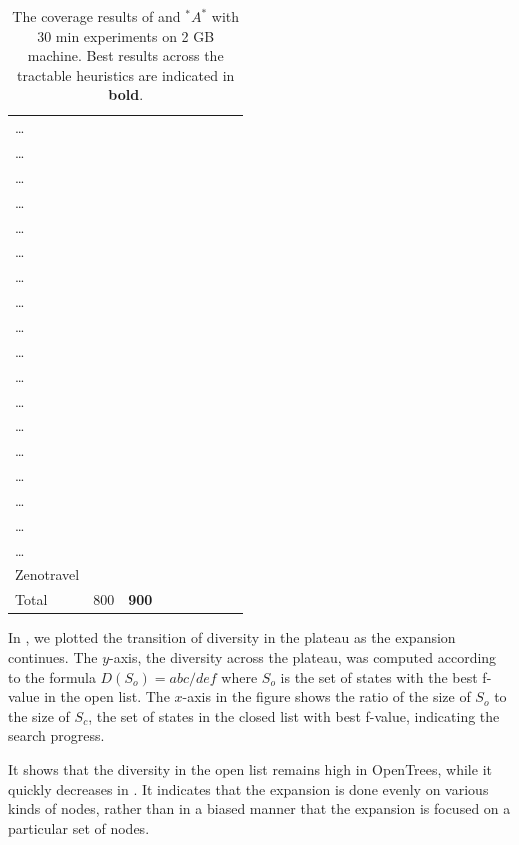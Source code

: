 {\begin{table}[htbp]
\begin{tabular}{l|ll|ll||ll|ll|}
\ldots{} &  &  &  &  &  &  &  & \\
\ldots{} &  &  &  &  &  &  &  & \\
\ldots{} &  &  &  &  &  &  &  & \\
\ldots{} &  &  &  &  &  &  &  & \\
\ldots{} &  &  &  &  &  &  &  & \\
\ldots{} &  &  &  &  &  &  &  & \\
\ldots{} &  &  &  &  &  &  &  & \\
\ldots{} &  &  &  &  &  &  &  & \\
\ldots{} &  &  &  &  &  &  &  & \\
\ldots{} &  &  &  &  &  &  &  & \\
\ldots{} &  &  &  &  &  &  &  & \\
\ldots{} &  &  &  &  &  &  &  & \\
\ldots{} &  &  &  &  &  &  &  & \\
\ldots{} &  &  &  &  &  &  &  & \\
\ldots{} &  &  &  &  &  &  &  & \\
\ldots{} &  &  &  &  &  &  &  & \\
\ldots{} &  &  &  &  &  &  &  & \\
\ldots{} &  &  &  &  &  &  &  & \\
Zenotravel &  &  &  &  &  &  &  & \\
\hline
Total & 800 & \textbf{900} &  &  &  &  &  & \\
\end{tabular}
\caption{The coverage results of \astar and $^*A^*$ with 30 min experiments on 2 GB machine. Best results across the tractable heuristics are indicated in \textbf{bold}.}
\label{tbl:main}
\end{table}

}

In , we plotted the transition of diversity in the plateau as the expansion continues. The $y$-axis, the diversity across the plateau, was computed according to the formula $D(S_o)=abc/def$ where $S_o$ is the set of states with the best f-value in the open list. The $x$-axis in the figure shows the ratio of the size of $S_o$ to the size of $S_c$, the set of states in the closed list with best f-value, indicating the search progress.

It shows that the diversity in the open list remains high in OpenTrees, while it quickly decreases in \astar. It indicates that the expansion is done evenly on various kinds of nodes, rather than in a biased manner that the expansion is focused on a particular set of nodes.


